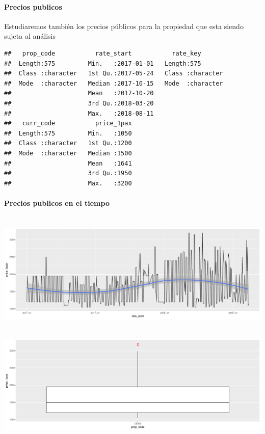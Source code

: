\documentclass{article}\usepackage[]{graphicx}\usepackage[]{color}
\makeatletter
\def\maxwidth{ %
  \ifdim\Gin@nat@width>\linewidth
    \linewidth
  \else
    \Gin@nat@width
  \fi
}
\newenvironment{kframe}{%
 \def\at@end@of@kframe{}%
 \ifinner\ifhmode%
  \def\at@end@of@kframe{\end{minipage}}%
  \begin{minipage}{\columnwidth}%
 \fi\fi%
 \def\FrameCommand##1{\hskip\@totalleftmargin \hskip-\fboxsep
 \colorbox{shadecolor}{##1}\hskip-\fboxsep
     \hskip-\linewidth \hskip-\@totalleftmargin \hskip\columnwidth}%
 \MakeFramed {\advance\hsize-\width
   \@totalleftmargin\z@ \linewidth\hsize
   \@setminipage}}%
 {\par\unskip\endMakeFramed%
 \at@end@of@kframe}
\newenvironment{knitrout}{}{} %
\makeatother
\begin{document}
\paragraph{Precios publicos}
Estudiaremos también los precios públicos para la propiedad que esta siendo sujeta al análisis
\begin{knitrout}
\color{fgcolor}\begin{kframe}
\begin{verbatim}
##   prop_code           rate_start           rate_key        
##  Length:575         Min.   :2017-01-01   Length:575        
##  Class :character   1st Qu.:2017-05-24   Class :character  
##  Mode  :character   Median :2017-10-15   Mode  :character  
##                     Mean   :2017-10-20                     
##                     3rd Qu.:2018-03-20                     
##                     Max.   :2018-08-11                     
##   curr_code           price_1pax  
##  Length:575         Min.   :1050  
##  Class :character   1st Qu.:1200  
##  Mode  :character   Median :1500  
##                     Mean   :1641  
##                     3rd Qu.:1950  
##                     Max.   :3200
\end{verbatim}
\end{kframe}
\end{knitrout}
\paragraph{Precios publicos en el tiempo} ~\\
\begin{knitrout}
\color{fgcolor}
\includegraphics[width=\maxwidth]{figures/PreciospubGraf-1} 

\end{knitrout}
~\\
\begin{knitrout}
\color{fgcolor}
\includegraphics[width=\maxwidth]{figures/Boxplotpubprice-1} 

\end{knitrout}
~\\
\end{document}
